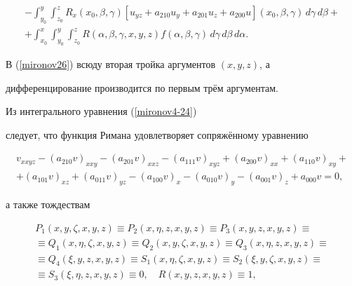 \begin{multline}


-\int_{y_{0}}^{y} \int_{z_{0}}^{z} R_{x}(x_{0}, \beta,\gamma)


[u_{yz}+a_{210}u_{y}+a_{201}u_{z}+a_{200}u] (x_{0}, \beta,\gamma)


\,d\gamma \,d\beta+


\\


\label{mironov26}


+\int_{x_{0}}^{x}  \int_{y_{0}}^{y}


\int_{z_{0}}^{z}


R(\alpha,\beta,\gamma,x, y, z)f(\alpha,\beta,\gamma)


\,d\gamma \,d\beta \,d\alpha.


\end{multline}


В (\ref{mironov26}) всюду вторая тройка аргументов $(x, y, z)$, а


дифференцирование производится по первым трём аргументам.








Из интегрального уравнения (\ref{mironov4-24})


следует, что функция Римана удовлетворяет сопряжённому уравнению


\begin{multline}\label{mironov27}


v_{xxyz}-(a_{210}v)_{xxy}-(a_{201}v)_{xxz}-(a_{111}v)_{xyz}


+(a_{200}v)_{xx}+(a_{110}v)_{xy}+\\


+(a_{101}v)_{xz}+(a_{011}v)_{yz}-(a_{100}v)_{x}-(a_{010}v)_{y}


-(a_{001}v)_{z}+a_{000}v=0,


\end{multline}


а также тождествам


\begin{multline}\label{mironov27+}


P_{1}(x,y,\zeta,x, y, z)\equiv P_{2}(x,\eta,z,x, y, z)\equiv


P_{3}(x, y, z,x, y, z) \equiv \\ \equiv Q_{1}(x,\eta,\zeta,x, y, z)\equiv Q_{2}(x,y,\zeta,x, y, z)\equiv Q_{3}(x,\eta,z,x, y, z)\equiv \\ \equiv  


Q_{4}(\xi,y,z,x, y, z)\equiv S_{1}(x,\eta,\zeta,x, y, z)\equiv


S_{2}(\xi,y,\zeta,x, y, z)\equiv \\ \equiv  S_{3}(\xi,\eta,z,x, y, z)\equiv 0,


\quad R(x, y, z,x, y, z)\equiv 1,


\end{multline}


